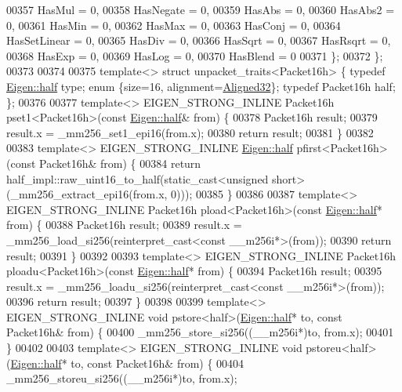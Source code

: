 \begin{DoxyCode}
00357     HasMul    = 0,
00358     HasNegate = 0,
00359     HasAbs    = 0,
00360     HasAbs2   = 0,
00361     HasMin    = 0,
00362     HasMax    = 0,
00363     HasConj   = 0,
00364     HasSetLinear = 0,
00365     HasDiv = 0,
00366     HasSqrt = 0,
00367     HasRsqrt = 0,
00368     HasExp = 0,
00369     HasLog = 0,
00370     HasBlend = 0
00371   \};
00372 \};
00373 
00374 
00375 \textcolor{keyword}{template}<> \textcolor{keyword}{struct }unpacket\_traits<Packet16h> \{ \textcolor{keyword}{typedef} \hyperlink{struct_eigen_1_1half}{Eigen::half} type; \textcolor{keyword}{enum} \{size=16, 
      alignment=\hyperlink{group__enums_gga45fe06e29902b7a2773de05ba27b47a1a7797d247b86f6e9837cc338beb6060de}{Aligned32}\}; \textcolor{keyword}{typedef} Packet16h half; \};
00376 
00377 \textcolor{keyword}{template}<> EIGEN\_STRONG\_INLINE Packet16h pset1<Packet16h>(\textcolor{keyword}{const} \hyperlink{struct_eigen_1_1half}{Eigen::half}& from) \{
00378   Packet16h result;
00379   result.x = \_mm256\_set1\_epi16(from.x);
00380   \textcolor{keywordflow}{return} result;
00381 \}
00382 
00383 \textcolor{keyword}{template}<> EIGEN\_STRONG\_INLINE \hyperlink{struct_eigen_1_1half}{Eigen::half} pfirst<Packet16h>(\textcolor{keyword}{const} Packet16h& from) \{
00384   \textcolor{keywordflow}{return} half\_impl::raw\_uint16\_to\_half(static\_cast<unsigned short>(\_mm256\_extract\_epi16(from.x, 0)));
00385 \}
00386 
00387 \textcolor{keyword}{template}<> EIGEN\_STRONG\_INLINE Packet16h pload<Packet16h>(\textcolor{keyword}{const} \hyperlink{struct_eigen_1_1half}{Eigen::half}* from) \{
00388   Packet16h result;
00389   result.x = \_mm256\_load\_si256(reinterpret\_cast<const \_\_m256i*>(from));
00390   \textcolor{keywordflow}{return} result;
00391 \}
00392 
00393 \textcolor{keyword}{template}<> EIGEN\_STRONG\_INLINE Packet16h ploadu<Packet16h>(\textcolor{keyword}{const} \hyperlink{struct_eigen_1_1half}{Eigen::half}* from) \{
00394   Packet16h result;
00395   result.x = \_mm256\_loadu\_si256(reinterpret\_cast<const \_\_m256i*>(from));
00396   \textcolor{keywordflow}{return} result;
00397 \}
00398 
00399 \textcolor{keyword}{template}<> EIGEN\_STRONG\_INLINE \textcolor{keywordtype}{void} pstore<half>(\hyperlink{struct_eigen_1_1half}{Eigen::half}* to, \textcolor{keyword}{const} Packet16h& from) \{
00400   \_mm256\_store\_si256((\_\_m256i*)to, from.x);
00401 \}
00402 
00403 \textcolor{keyword}{template}<> EIGEN\_STRONG\_INLINE \textcolor{keywordtype}{void} pstoreu<half>(\hyperlink{struct_eigen_1_1half}{Eigen::half}* to, \textcolor{keyword}{const} Packet16h& from) \{
00404   \_mm256\_storeu\_si256((\_\_m256i*)to, from.x);

\end{DoxyCode}
